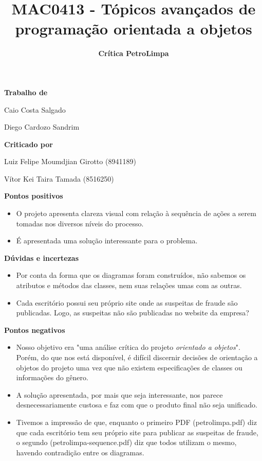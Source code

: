 \documentclass{article}
\title{\textbf{MAC0413 - Tópicos avançados de programação orientada a objetos}}
\author{\textbf{Crítica PetroLimpa}}
\date{}
\begin{document}
\maketitle

\begin{center}
\textbf{\large{Trabalho de}}

Caio Costa Salgado

Diego Cardozo Sandrim

\bigskip
\textbf{\large{Criticado por}}

Luiz Felipe Moumdjian Girotto (8941189)

Vítor Kei Taira Tamada (8516250)
\end{center}

\textbf{\LARGE{Pontos positivos}}

\begin{itemize}

\item O projeto apresenta clareza visual com relação à sequência de ações a serem tomadas nos diversos níveis do processo.

\item É apresentada uma solução interessante para o problema.

\end{itemize}

\bigskip
\bigskip
\textbf{\LARGE{Dúvidas e incertezas}}

\begin{itemize}

\item Por conta da forma que os diagramas foram construídos, não sabemos os atributos e métodos das classes, nem suas relações umas com as outras.

\item Cada escritório possui seu próprio site onde as suspeitas de fraude são publicadas. Logo, as suspeitas não são publicadas no website da empresa?

\end{itemize}

\bigskip
\bigskip
\textbf{\LARGE{Pontos negativos}}

\begin{itemize}

\item Nosso objetivo era "uma análise crítica do projeto \textit{orientado a objetos}". Porém, do que nos está disponível, é difícil discernir decisões de orientação a objetos do projeto uma vez que não existem especificações de classes ou informações do gênero.

\item A solução apresentada, por mais que seja interessante, nos parece desnecessariamente custosa e faz com que o produto final não seja unificado.

\item Tivemos a impressão de que, enquanto o primeiro PDF (petrolimpa.pdf) diz que cada escritório tem seu próprio site para publicar as suspeitas de fraude, o segundo (petrolimpa-sequence.pdf) diz que todos utilizam o mesmo, havendo contradição entre os diagramas.

\end{itemize}
\end{document}
